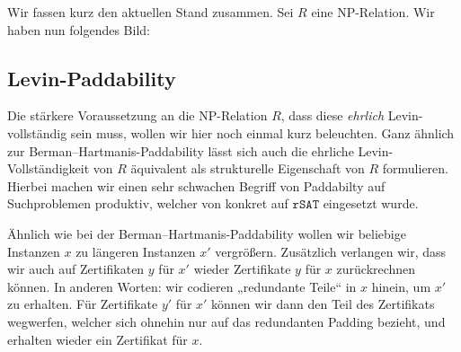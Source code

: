 Wir fassen kurz den aktuellen Stand zusammen. Sei $R$ eine NP-Relation. 
Wir haben nun folgendes Bild:

\begin{center}
\end{center}

\subsection*{Levin-Paddability}

Die stärkere Voraussetzung an die NP-Relation $R$, dass diese \emph{ehrlich} Levin-vollständig sein muss, wollen wir hier noch einmal kurz beleuchten. Ganz ähnlich zur Berman–Hartmanis-Paddability lässt sich auch die ehrliche Levin-Vollständigkeit von $R$ äquivalent als strukturelle Eigenschaft von $R$ formulieren. Hierbei machen wir einen sehr schwachen Begriff von Paddabilty auf Suchproblemen produktiv, welcher von \textcite{kobler_is_2000} konkret auf $\mathtt{rSAT}$ eingesetzt wurde.

Ähnlich wie bei der Berman–Hartmanis-Paddability wollen wir beliebige Instanzen $x$ zu längeren Instanzen $x'$ vergrößern. Zusätzlich verlangen wir, dass wir auch auf Zertifikaten $y$ für $x'$ wieder Zertifikate $y$ für $x$ zurückrechnen können. In anderen Worten: wir codieren „redundante Teile“ in $x$ hinein, um $x'$ zu erhalten. Für Zertifikate $y'$ für $x'$ können wir dann den Teil des Zertifikats wegwerfen, welcher sich ohnehin nur auf das redundanten Padding bezieht, und erhalten wieder ein Zertifikat für $x$. 

